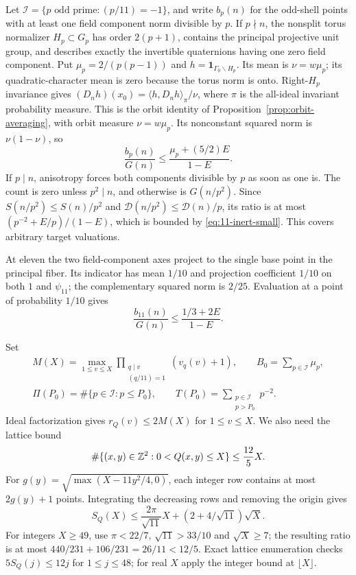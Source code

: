 Let $\mathcal I=\{p\text{ odd prime}:(p/11)=-1\}$, and write
$b_p(n)$ for the odd-shell points with at least one field component
norm divisible by $p$.  If $p\nmid n$, the nonsplit torus normalizer
$H_p\subset G_p$ has order $2(p+1)$, contains the principal projective
unit group, and describes exactly the invertible quaternions having
one zero field component.  Put $\mu_p=2/(p(p-1))$ and
$h=\mathbf1_{\Gamma_0\backslash H_p}$.  Its mean is $\nu=w\mu_p$;
its quadratic-character mean is zero because the torus norm is onto.
Right-$H_p$ invariance gives
$(D_nh)(x_0)=\langle h,D_nh\rangle_\pi/\nu$, where $\pi$ is the
all-ideal invariant probability measure. This is the orbit identity of
Proposition~\ref{prop:orbit-averaging}, with orbit measure $\nu=w\mu_p$.
Its nonconstant squared norm is $\nu(1-\nu)$, so
\begin{equation}\label{eq:11-inert-small}
 \frac{b_p(n)}{G(n)}\le\frac{\mu_p+(5/2)E}{1-E}.
\end{equation}
If $p\mid n$, anisotropy forces both components divisible by $p$
as soon as one is.  The count is zero unless $p^2\mid n$, and
otherwise is $G(n/p^2)$.  Since
$S(n/p^2)\le S(n)/p^2$ and $\mathcal D(n/p^2)\le\mathcal D(n)/p$,
its ratio is at most $(p^{-2}+E/p)/(1-E)$, which is bounded by
\eqref{eq:11-inert-small}.  This covers arbitrary target valuations.

At eleven the two field-component axes project to the single base
point in the principal fiber.  Its indicator has mean $1/10$ and
projection coefficient $1/10$ on both $1$ and $\psi_{11}$; the
complementary squared norm is $2/25$.  Evaluation at a point of
probability $1/10$ gives
\begin{equation}\label{eq:11-ramified-small}
 \frac{b_{11}(n)}{G(n)}\le\frac{1/3+2E}{1-E}.
\end{equation}

Set
\[
 \begin{gathered}
 M(X)=\max_{1\le v\le X}
       \prod_{\substack{q\mid v\\(q/11)=1}}(v_q(v)+1),\qquad
 B_0=\sum_{p\in\mathcal I}\mu_p,\\
 \Pi(P_0)=\#\{p\in\mathcal I:p\le P_0\},\qquad
 T(P_0)=\sum_{\substack{p\in\mathcal I\\p>P_0}}p^{-2}.
 \end{gathered}
\]
Ideal factorization gives $r_Q(v)\le2M(X)$ for $1\le v\le X$.
We also need the lattice bound
\begin{equation}\label{eq:11-lattice}
 \#\{(x,y)\in\mathbb Z^2:0<Q(x,y)\le X\}\le\frac{12}{5}X.
\end{equation}
For $g(y)=\sqrt{\max(X-11y^2/4,0)}$, each integer row contains
at most $2g(y)+1$ points.  Integrating the decreasing rows and
removing the origin gives
\[
 S_Q(X)\le\frac{2\pi}{\sqrt{11}}X+
                    (2+4/\sqrt{11})\sqrt X.
\]
For integers $X\ge49$, use $\pi<22/7$, $\sqrt{11}>33/10$ and
$\sqrt X\ge7$; the resulting ratio is at most
$440/231+106/231=26/11<12/5$.
Exact lattice enumeration checks $5S_Q(j)\le12j$ for $1\le j\le48$;
for real $X$ apply the integer bound at $\lfloor X\rfloor$.

